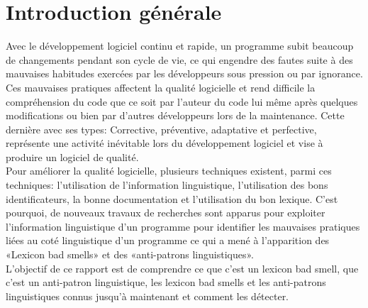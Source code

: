 \chapter*{Introduction générale}
\tab Avec le développement logiciel continu et rapide, un programme subit beaucoup de changements pendant son cycle de vie, ce qui engendre des fautes suite à des mauvaises habitudes exercées par les développeurs sous pression ou par ignorance. Ces mauvaises pratiques affectent la qualité logicielle et rend difficile la compréhension du code que ce soit par l’auteur du code lui même après quelques modifications ou bien par d’autres développeurs lors de la maintenance. Cette dernière avec ses types: Corrective, préventive, adaptative et  perfective, représente une activité inévitable lors du développement logiciel et vise à produire un logiciel de qualité.  
\vspace{5px}\\
Pour améliorer la qualité logicielle, plusieurs techniques existent, parmi ces techniques: l’utilisation de l’information linguistique, l’utilisation des bons identificateurs, la bonne documentation et l’utilisation du bon lexique. C’est pourquoi, de nouveaux travaux de recherches sont apparus pour exploiter l’information linguistique d’un programme pour identifier les mauvaises pratiques liées au coté linguistique d’un programme ce qui a mené à l’apparition des «Lexicon bad smells» et des «anti-patrons linguistiques». 
\vspace{5px}\\
L’objectif de ce rapport est de comprendre ce que c'est un lexicon bad smell, que c'est un anti-patron linguistique, les lexicon bad smells et les anti-patrons linguistiques connus jusqu’à maintenant et comment les détecter.